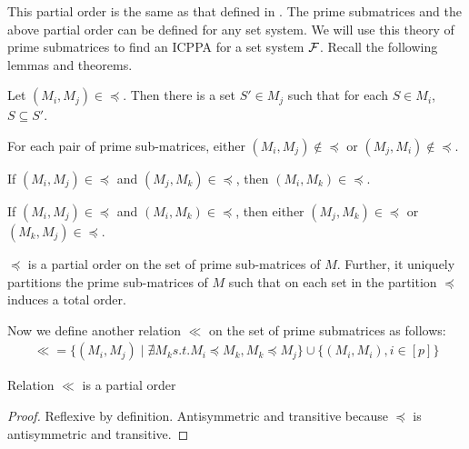 \documentclass{llncs}
\def\cF{{\cal F}}
\begin{document}
This partial order is the same as that defined in \cite{nsnrs09}. The prime submatrices and the above partial order can be defined for
any set system. We will use this theory of prime submatrices to find
an ICPPA for a set system $\cF$. Recall the following lemmas and theorems.

\begin{lemma} \label{lem:containment}
Let $(M_i,M_j) \in \preccurlyeq$.  Then there is a set $S' \in M_j$ such that for each $S \in M_i$, $S \subseteq S'$. 
\end{lemma}
\begin{lemma}
For each pair of prime sub-matrices, either $(M_i,M_j) \not\in \preccurlyeq$ or $(M_j,M_i) \not\in \preccurlyeq$.
\end{lemma}
\begin{lemma}
If $(M_i,M_j) \in \preccurlyeq $ and $(M_j,M_k) \in \preccurlyeq$, then $(M_i,M_k) \in \preccurlyeq$.
\end{lemma}
\begin{lemma}
If $(M_i,M_j) \in \preccurlyeq$ and $(M_i,M_k) \in \preccurlyeq$, then
either $(M_j,M_k) \in \preccurlyeq$ or $(M_k,M_j) \in \preccurlyeq$. 
\end{lemma}
\begin{theorem} \label{thm:partitionold}
  $\preccurlyeq$ is a partial order on the set of prime sub-matrices
  of $M$.  Further, it uniquely partitions the prime sub-matrices of
  $M$ such that on each set in the partition $\preccurlyeq$ induces a
  total order.
\end{theorem}



Now we define another relation $\ll$ on the set of prime
submatrices as follows:\\
\begin{align*}
  \ll = \{ (M_i,M_j) \mid \nexists M_k s.t. M_i \preccurlyeq M_k, M_k \preccurlyeq M_j
  \} \cup \{ (M_i,M_i), i \in [p] \}
\end{align*}

\begin{lemma}
  Relation $\ll$ is a partial order
\end{lemma}
\begin{proof}
Reflexive by definition. Antisymmetric and transitive because
$\preccurlyeq$ is antisymmetric and transitive. 
\end{proof}
\end{document}
